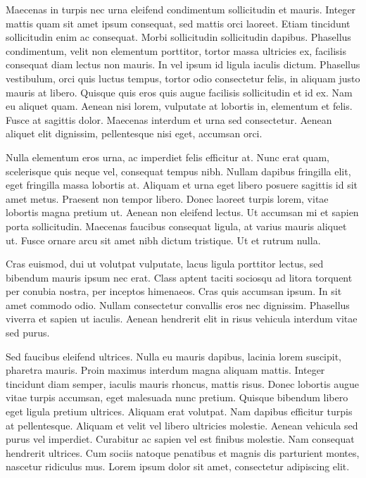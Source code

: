 Maecenas in turpis nec urna eleifend condimentum sollicitudin et mauris. Integer mattis quam sit amet ipsum consequat, sed mattis orci laoreet. Etiam tincidunt sollicitudin enim ac consequat. Morbi sollicitudin sollicitudin dapibus. Phasellus condimentum, velit non elementum porttitor, tortor massa ultricies ex, facilisis consequat diam lectus non mauris. In vel ipsum id ligula iaculis dictum. Phasellus vestibulum, orci quis luctus tempus, tortor odio consectetur felis, in aliquam justo mauris at libero. Quisque quis eros quis augue facilisis sollicitudin et id ex. Nam eu aliquet quam. Aenean nisi lorem, vulputate at lobortis in, elementum et felis. Fusce at sagittis dolor. Maecenas interdum et urna sed consectetur. Aenean aliquet elit dignissim, pellentesque nisi eget, accumsan orci.

Nulla elementum eros urna, ac imperdiet felis efficitur at. Nunc erat quam, scelerisque quis neque vel, consequat tempus nibh. Nullam dapibus fringilla elit, eget fringilla massa lobortis at. Aliquam et urna eget libero posuere sagittis id sit amet metus. Praesent non tempor libero. Donec laoreet turpis lorem, vitae lobortis magna pretium ut. Aenean non eleifend lectus. Ut accumsan mi et sapien porta sollicitudin. Maecenas faucibus consequat ligula, at varius mauris aliquet ut. Fusce ornare arcu sit amet nibh dictum tristique. Ut et rutrum nulla.

Cras euismod, dui ut volutpat vulputate, lacus ligula porttitor lectus, sed bibendum mauris ipsum nec erat. Class aptent taciti sociosqu ad litora torquent per conubia nostra, per inceptos himenaeos. Cras quis accumsan ipsum. In sit amet commodo odio. Nullam consectetur convallis eros nec dignissim. Phasellus viverra et sapien ut iaculis. Aenean hendrerit elit in risus vehicula interdum vitae sed purus.

Sed faucibus eleifend ultrices. Nulla eu mauris dapibus, lacinia lorem suscipit, pharetra mauris. Proin maximus interdum magna aliquam mattis. Integer tincidunt diam semper, iaculis mauris rhoncus, mattis risus. Donec lobortis augue vitae turpis accumsan, eget malesuada nunc pretium. Quisque bibendum libero eget ligula pretium ultrices. Aliquam erat volutpat. Nam dapibus efficitur turpis at pellentesque. Aliquam et velit vel libero ultricies molestie. Aenean vehicula sed purus vel imperdiet. Curabitur ac sapien vel est finibus molestie. Nam consequat hendrerit ultrices. Cum sociis natoque penatibus et magnis dis parturient montes, nascetur ridiculus mus. Lorem ipsum dolor sit amet, consectetur adipiscing elit.

